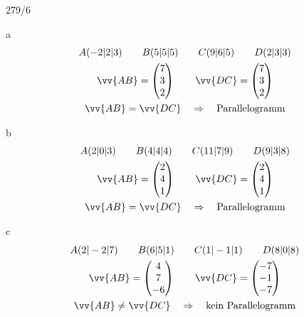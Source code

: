 \begin{exercise}{279/6}
  \item [a]
  \begin{gather*}
    A(-2|2|3) \qquad B(5|5|5) \qquad C(9|6|5) \qquad D(2|3|3) \\
    \vv{AB} = \begin{pmatrix}7 \\ 3 \\ 2\end{pmatrix} \qquad \vv{DC} = \begin{pmatrix}7 \\ 3 \\ 2\end{pmatrix} \\
    \vv{AB} = \vv{DC} \quad\Rightarrow\quad \text{Parallelogramm}
  \end{gather*}
  \item [b]
  \begin{gather*}
    A(2|0|3) \qquad B(4|4|4) \qquad C(11|7|9) \qquad D(9|3|8) \\
    \vv{AB} = \begin{pmatrix}2 \\ 4 \\ 1\end{pmatrix} \qquad \vv{DC} = \begin{pmatrix}2 \\ 4 \\ 1\end{pmatrix} \\
    \vv{AB} = \vv{DC} \quad\Rightarrow\quad \text{Parallelogramm}
  \end{gather*}
  \item [c]
  \begin{gather*}
    A(2|-2|7) \qquad B(6|5|1) \qquad C(1|-1|1) \qquad D(8|0|8) \\
    \vv{AB} = \begin{pmatrix}4 \\ 7 \\ -6\end{pmatrix} \qquad \vv{DC} = \begin{pmatrix}-7 \\ -1 \\ -7\end{pmatrix} \\
    \vv{AB} \neq \vv{DC} \quad\Rightarrow\quad \text{kein Parallelogramm}
  \end{gather*}
\end{exercise}
\newpage
